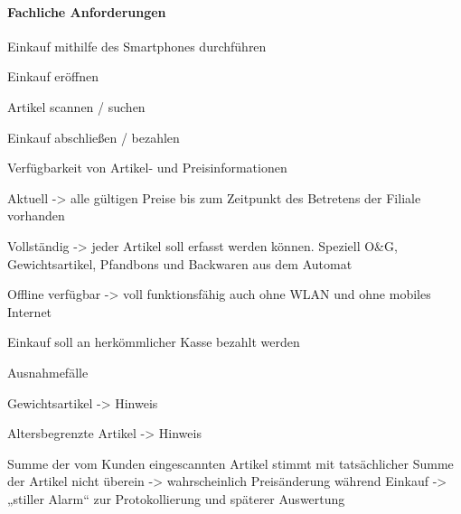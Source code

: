 \paragraph{Fachliche Anforderungen}
\begin{seList}
	\item Einkauf mithilfe des Smartphones durchführen
	\begin{seList}
		\item Einkauf eröffnen
		\item Artikel scannen / suchen
		\item Einkauf abschließen / bezahlen
	\end{seList}
	\item Verfügbarkeit von Artikel- und Preisinformationen
	\begin{seList}
		\item Aktuell -> alle gültigen Preise bis zum Zeitpunkt des Betretens der Filiale vorhanden
		\item Vollständig -> jeder Artikel soll erfasst werden können. Speziell O\&G, Gewichtsartikel, Pfandbons und Backwaren aus dem Automat
		\item Offline verfügbar -> voll funktionsfähig auch ohne WLAN und ohne mobiles Internet
	\end{seList}
	\item Einkauf soll an herkömmlicher Kasse bezahlt werden
	\item Ausnahmefälle
	\begin{seList}
		\item Gewichtsartikel -> Hinweis
		\item Altersbegrenzte Artikel -> Hinweis
		\item Summe der vom Kunden eingescannten Artikel stimmt mit tatsächlicher Summe der Artikel nicht überein -> wahrscheinlich Preisänderung während Einkauf -> „stiller Alarm“ zur Protokollierung und späterer Auswertung
	\end{seList}
\end{seList}


